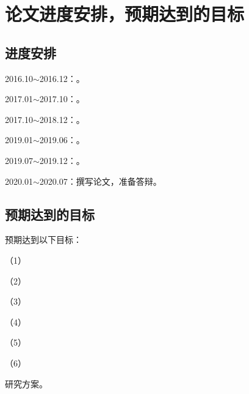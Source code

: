 
\section{论文进度安排，预期达到的目标}
\subsection{进度安排}
2016.10$\sim$2016.12：。

2017.01$\sim$2017.10：。

2017.10$\sim$2018.12：。

2019.01$\sim$2019.06：。

2019.07$\sim$2019.12：。

2020.01$\sim$2020.07：撰写论文，准备答辩。


\subsection{预期达到的目标}

预期达到以下目标：

（1）

（2）

（3）

（4）

（5）

（6）

研究方案。
